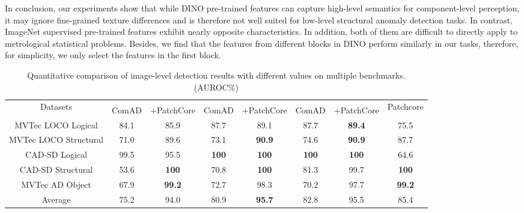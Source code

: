 \documentclass[final,5p,times,twocolumn]{elsarticle}
\begin{document}
In conclusion, our experiments show that while DINO pre-trained features can capture high-level semantics for component-level perception, it may ignore fine-grained texture differences and is therefore not well suited for low-level structural anomaly detection tasks. In contrast, ImageNet supervised pre-trained features exhibit nearly opposite characteristics. In addition, both of them are difficult to directly apply to metrological statistical problems. Besides, we find that the features from different blocks in DINO perform similarly in our tasks, therefore, for simplicity, we only select the features in the first block.

\begin{table*}[]
\caption{Quantitative comparison of image-level detection results with different  values on multiple benchmarks. (AUROC\%)}
\centering
\label{Table5}
\begin{tabular}{c|cc|cc|cc|c}
\hline
\multirow{2}{*}{Datasets} & \multicolumn{2}{c|}{} & \multicolumn{2}{c|}{} & \multicolumn{2}{c|}{} & \multirow{2}{*}{Patchcore} \\
                          & ComAD    & +PatchCore    & ComAD    & +PatchCore    & ComAD    & +PatchCore    &                            \\ \hline
MVTec LOCO Logical        & 84.1     & 85.9          & 87.7     & 89.1          & 87.7     & \textbf{89.4}          & 75.5                       \\
MVTec LOCO Structural     & 71.0     & 89.6          & 73.1     & \textbf{90.9}          & 74.6     & \textbf{90.9}          & 87.7                       \\
CAD-SD Logical            & 99.5     & 95.5          & \textbf{100}      & \textbf{100}           & \textbf{100}      & \textbf{100}           & 64.6                       \\
CAD-SD Structural         & 53.6     & \textbf{100}           & 70.8     & \textbf{100}           & 81.3     & 99.7          & \textbf{100}                        \\
MVTec AD Object           & 67.9     & \textbf{99.2}          & 72.7     & 98.3          & 70.2     & 97.7          & \textbf{99.2}                       \\ \hline
Average                   & 75.2     & 94.0          & 80.9     & \textbf{95.7}          & 82.8     & 95.5          & 85.4                       \\ \hline
\end{tabular}
\end{table*}
\end{document}

